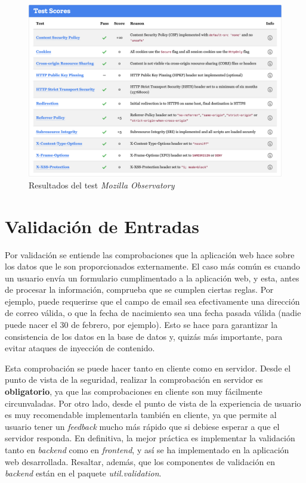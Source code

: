 \documentclass[a4paper,12pt,twoside,openright]{report}
\begin{document}
	\begin{figure}[hbt!]
		\centering
		\includegraphics[width=\textwidth,keepaspectratio]{moz_scan_results}
		\caption{Resultados del test \emph{Mozilla Observatory}}
		\label{fig:moz_scan_results}
	\end{figure}
	
	\section{Validación de Entradas}
	Por validación se entiende las comprobaciones que la aplicación web hace sobre los datos que le son proporcionados externamente. El caso más común es cuando un usuario envía un formulario cumplimentado a la aplicación web, y esta, antes de procesar la información, comprueba que se cumplen ciertas reglas. Por ejemplo, puede requerirse que el campo de email sea efectivamente una dirección de correo válida, o que la fecha de nacimiento sea una fecha pasada válida (nadie puede nacer el 30 de febrero, por ejemplo). Esto se hace para garantizar la consistencia de los datos en la base de datos y, quizás más importante, para evitar ataques de inyección de contenido.
	
	Esta comprobación se puede hacer tanto en cliente como en servidor. Desde el punto de vista de la seguridad, realizar la comprobación en servidor es \textbf{obligatorio}, ya que las comprobaciones en cliente son muy fácilmente circunvaladas. Por otro lado, desde el punto de vista de la experiencia de usuario es muy recomendable implementarla también en cliente, ya que permite al usuario tener un \emph{feedback} mucho más rápido que si debiese esperar a que el servidor responda. En definitiva, la mejor práctica es implementar la validación tanto en \emph{backend} como en \emph{frontend}, y así se ha implementado en la aplicación web desarrollada. Resaltar, además, que los componentes de validación en \emph{backend} están en el paquete \emph{util.validation}.
	
\end{document}
